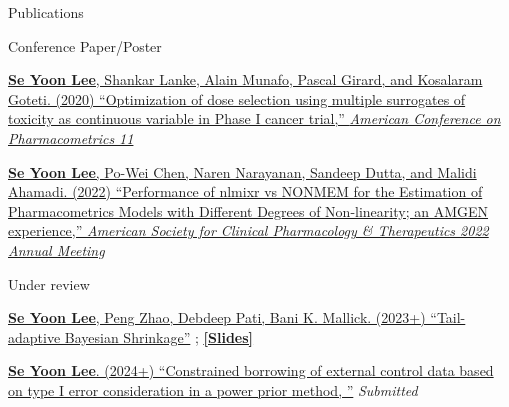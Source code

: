 \documentclass[
	11pt, %
]{resume} %
\begin{document}
\begin{rSection}{Publications}
\begin{rSubsection}{Conference Paper/Poster}{}{}{}
\item[] [1] 
\href{https://github.com/yain22/2PLD/blob/main/Poster/ACOP_Se_Yoon_Lee_PhD.pdf}{\underline{\textbf{Se Yoon Lee}}, Shankar Lanke, Alain Munafo, Pascal Girard, and Kosalaram Goteti. (2020)
``Optimization of dose selection using multiple surrogates of toxicity as continuous variable in Phase I cancer trial,'' \textit{American Conference on Pharmacometrics 11}}
\item[] [2] 
\href{https://github.com/yain22/2PLD/blob/main/Poster/ASCPT-2022-Poster_nlmixr_Final.pdf}{\underline{\textbf{Se Yoon Lee}}, Po-Wei Chen, Naren Narayanan, Sandeep Dutta, and Malidi Ahamadi. (2022)
``Performance of nlmixr vs NONMEM for the Estimation of Pharmacometrics Models with Different Degrees of Non-linearity; an AMGEN experience,'' \textit{American Society for Clinical Pharmacology \& Therapeutics 2022 Annual Meeting}}
\end{rSubsection}



\begin{rSubsection}{Under review}{}{}{}
\item[] [1]
\href{https://arxiv.org/abs/2007.02192}
{\underline{\textbf{Se Yoon Lee}}, Peng Zhao, Debdeep Pati, Bani K. Mallick. (2023+)
``Tail-adaptive Bayesian Shrinkage''}
;
\href{https://www.dropbox.com/s/5sx21h4guwl4dyz/Main_Doctoral_Dissertation_Work.pdf?dl=0}{\underline{\textbf{[Slides]}}}
\item[] [2]
\href{}{\underline{\textbf{Se Yoon Lee}}. (2024+)
	``Constrained borrowing of external control data based on type I error consideration in a power prior method, ''} \textit{Submitted}
\end{rSubsection}
\end{rSection}
\end{document}
